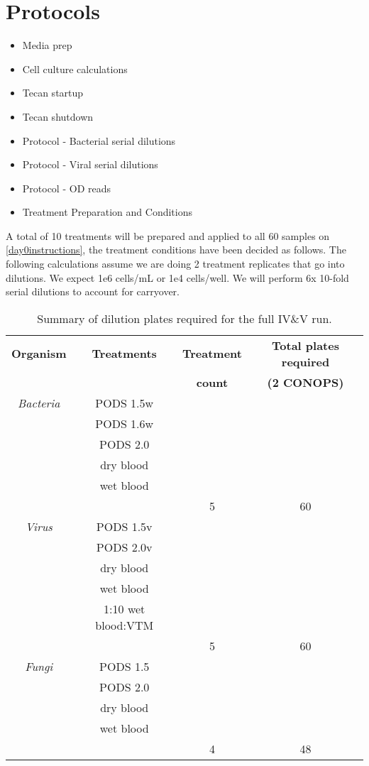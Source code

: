 \documentclass{article}
\newcounter{comments}
\newcommand{\bradley}[1]{{\addtocounter{comments}{1}}{\color{violet}{[\textbf{TODO Bradley \thecomments :}\ #1]}}}
\begin{document}
\section{Protocols}
\begin{itemize}
    \item Media prep
    \item Cell culture calculations
    \item Tecan startup
    \item Tecan shutdown
    \item Protocol - Bacterial serial dilutions
    \item Protocol - Viral serial dilutions
    \item Protocol - OD reads
    \item Treatment Preparation and Conditions \bradley{}
\end{itemize}
A total of 10 treatments will be prepared and applied to all 60 samples on  \ref{day0instructions}, the treatment conditions have been decided as follows. The following calculations assume we are doing 2 treatment replicates that go into dilutions. We expect 1e6 cells/mL or 1e4 cells/well. We will perform 6x 10-fold serial dilutions to account for carryover.
\begin{table}
  \centering
  \begin{tabular}[]{c|c|c|c}
    \textbf{Organism} & \textbf{Treatments} & \textbf{Treatment} & \textbf{Total plates required} \\
     &  & \textbf{count} & \textbf{(2 CONOPS)} \\
    \hline
    \textit{Bacteria} & PODS 1.5w  & & \\
     & PODS 1.6w  & & \\
     & PODS 2.0  & & \\
     & dry blood  & & \\
     & wet blood  & & \\
    \hline
    & & 5 & 60\\
    \hline
    \textit{Virus} & PODS 1.5v  & & \\
     & PODS 2.0v  & & \\
     & dry blood  & & \\
     & wet blood  & & \\
             & 1:10 wet blood:VTM  & & \\
    \hline
    & & 5 & 60\\
    \hline
    \textit{Fungi} & PODS 1.5  & & \\
     & PODS 2.0  & & \\
     & dry blood  & & \\
     & wet blood  & & \\
    \hline
    & & 4 & 48\\
    \hline

  \end{tabular}
  \caption{Summary of dilution plates required for the full IV\&V run.}
  \label{tab:dilution-plan}
\end{table}
\end{document}
